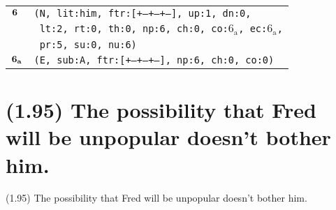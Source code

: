 \documentclass{article}
\begin{document}
\begin{minipage}{\textwidth}
{\begin{tabular}{|r|l|}
    ${\textbf{\textrm{6}}_{\phantom{z}}}$ & \texttt{\texttt{(N,~lit:him,~ftr:[+--+--+--],~up:1,~dn:0,}} \\
    & \texttt{\texttt{~lt:2,~rt:0,~th:0,~np:6,~ch:0,~co:${\textrm{6}_{\textrm{a}}}$,~ec:${\textrm{6}_{\textrm{a}}}$,}} \\
    & \texttt{\texttt{~pr:5,~su:0,~nu:6)}} \\
    ${\textbf{\textrm{6}}_{\textbf{\textrm{a}}}}$ & \texttt{\texttt{(E,~sub:A,~ftr:[+--+--+--],~np:6,~ch:0,~co:0)}} \\
    \hline
  \end{tabular}
  }
\end{minipage}
\bigbreak

\clearpage

%
%

\section*{(1.95) The possibility that Fred will be unpopular doesn’t bother him.}

\bigbreak
\begin{enumerate*}
\item[(1.95)] The possibility that Fred will be unpopular doesn’t bother him.
\end{enumerate*}
\bigbreak
\end{document}
